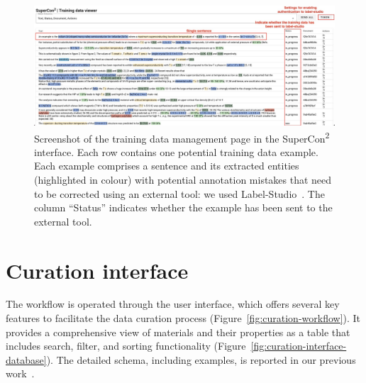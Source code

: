 \begin{figure}[htpb]
  \centering
  \includegraphics[width=1\textwidth]{figures/curation/training-data-viewer} 
  \caption{Screenshot of the training data management page in the SuperCon\textsuperscript{2} interface. Each row contains one potential training data example. Each example comprises a sentence and its extracted entities (highlighted in colour) with potential annotation mistakes that need to be corrected using an external tool: we used Label-Studio~\cite{Label_Studio}. The column ``Status'' indicates whether the example has been sent to the external tool.}
  \label{fig:training-data-view}
\end{figure}

\section{Curation interface}
\label{sec:user-interface}

The workflow is operated through the user interface, which offers several key features to facilitate the data curation process (Figure~\ref{fig:curation-workflow}).
It provides a comprehensive view of materials and their properties as a table that includes search, filter, and sorting functionality (Figure~\ref{fig:curation-interface-database}). 
The detailed schema, including examples, is reported in our previous work~\cite{foppiano2023automatic}.

